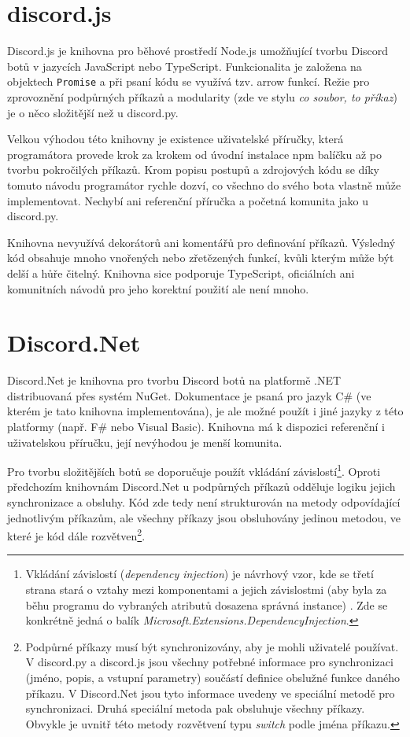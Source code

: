 \documentclass[FM]{tulthesis}
\begin{document}
	\section{discord.js}
	
	Discord.js je knihovna pro běhové prostředí Node.js umožňující tvorbu Discord botů v jazycích JavaScript nebo TypeScript. Funkcionalita je založena na objektech \verb*|Promise| a při psaní kódu se využívá tzv. arrow funkcí. Režie pro zprovoznění podpůrných příkazů a modularity (zde ve stylu \textit{co soubor, to příkaz}) je o něco složitější než u discord.py.
	
	Velkou výhodou této knihovny je existence uživatelské příručky, která programátora provede krok za krokem od úvodní instalace npm balíčku až po tvorbu pokročilých příkazů. Krom popisu postupů a zdrojových kódu se díky tomuto návodu programátor rychle dozví, co všechno do svého bota vlastně může implementovat. Nechybí ani referenční příručka a početná komunita jako u discord.py.
	
	Knihovna nevyužívá dekorátorů ani komentářů pro definování příkazů. Výsledný kód obsahuje mnoho vnořených nebo zřetězených funkcí, kvůli kterým může být delší a hůře čitelný. Knihovna sice podporuje TypeScript, oficiálních ani komunitních návodů pro jeho korektní použití ale není mnoho.
	
	\section{Discord.Net}
	
	Discord.Net je knihovna pro tvorbu Discord botů na platformě .NET distribuovaná přes systém NuGet. Dokumentace je psaná pro jazyk C\# (ve kterém je tato knihovna implementována), je ale možné použít i jiné jazyky z této platformy (např. F\# nebo Visual Basic). Knihovna má k dispozici referenční i uživatelskou příručku, její nevýhodou je menší komunita.
	
	 Pro tvorbu složitějších botů se doporučuje použít vkládání závislostí\footnote{Vkládání závislostí (\textit{dependency injection}) je návrhový vzor, kde se třetí strana stará o vztahy mezi komponentami a jejich závislostmi (aby byla za běhu programu do vybraných atributů dosazena správná instance) \cite{lit_distributedSystems}. Zde se konkrétně jedná o balík \textit{Microsoft.Extensions.DependencyInjection}.}. Oproti předchozím knihovnám Discord.Net u podpůrných příkazů odděluje logiku jejich synchronizace a obsluhy. Kód zde tedy není strukturován na metody odpovídající jednotlivým příkazům, ale všechny příkazy jsou obsluhovány jedinou metodou, ve které je kód dále rozvětven\footnote{Podpůrné příkazy musí být synchronizovány, aby je mohli uživatelé používat. V discord.py a discord.js jsou všechny potřebné informace pro synchronizaci (jméno, popis, a vstupní parametry) součástí definice obslužné funkce daného příkazu. V Discord.Net jsou tyto informace uvedeny ve speciální metodě pro synchronizaci. Druhá speciální metoda pak obsluhuje všechny příkazy. Obvykle je uvnitř této metody rozvětvení typu \textit{switch} podle jména příkazu.}.
	
\end{document}
